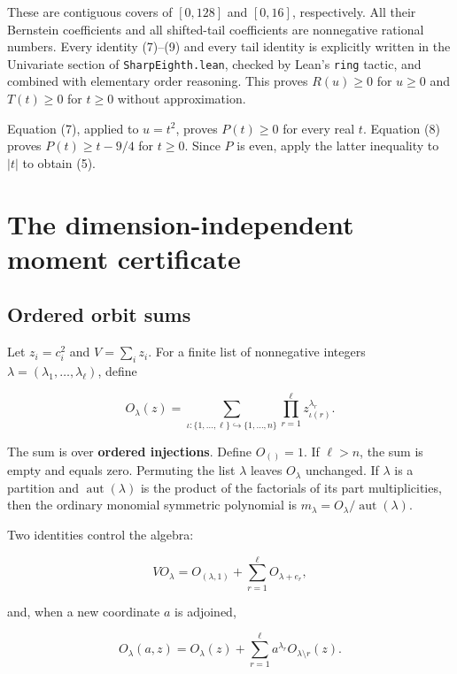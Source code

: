 \documentclass[11pt]{article}
\begin{document}
These are contiguous covers of \([0,128]\) and \([0,16]\), respectively.
All their Bernstein coefficients and all shifted-tail coefficients are
nonnegative rational numbers. Every identity (7)--(9) and every tail
identity is explicitly written in the Univariate section of
\texttt{SharpEighth.lean}, checked by Lean's \texttt{ring} tactic, and
combined with elementary order reasoning. This proves \(R(u)\ge0\) for
\(u\ge0\) and \(T(t)\ge0\) for \(t\ge0\) without approximation.

Equation (7), applied to \(u=t^2\), proves \(P(t)\ge0\) for every real
\(t\). Equation (8) proves \(P(t)\ge t-9/4\) for \(t\ge0\). Since \(P\)
is even, apply the latter inequality to \(|t|\) to obtain (5).

\hypertarget{the-dimension-independent-moment-certificate}{%
\section{The dimension-independent moment
certificate}\label{the-dimension-independent-moment-certificate}}

\hypertarget{ordered-orbit-sums}{%
\subsection{Ordered orbit sums}\label{ordered-orbit-sums}}

Let \(z_i=c_i^2\) and \(V=\sum_i z_i\). For a finite list of nonnegative
integers \(\lambda=(\lambda_1,\ldots,\lambda_\ell)\), define

\[O_\lambda(z)=\sum_{\iota:\{1,\ldots,\ell\}\hookrightarrow\{1,\ldots,n\}}
       \prod_{r=1}^{\ell}z_{\iota(r)}^{\lambda_r}. \tag{10}\]

The sum is over \textbf{ordered injections}. Define \(O_{()}=1\). If
\(\ell>n\), the sum is empty and equals zero. Permuting the list
\(\lambda\) leaves \(O_\lambda\) unchanged. If \(\lambda\) is a
partition and \(\operatorname{aut}(\lambda)\) is the product of the
factorials of its part multiplicities, then the ordinary monomial
symmetric polynomial is
\(m_\lambda=O_\lambda/\operatorname{aut}(\lambda)\).

Two identities control the algebra:

\[V O_\lambda=O_{(\lambda,1)}+\sum_{r=1}^{\ell}O_{\lambda+e_r}, \tag{11}\]

and, when a new coordinate \(a\) is adjoined,

\[O_\lambda(a,z)=O_\lambda(z)+
  \sum_{r=1}^{\ell}a^{\lambda_r}O_{\lambda\setminus r}(z). \tag{12}\]
\end{document}
